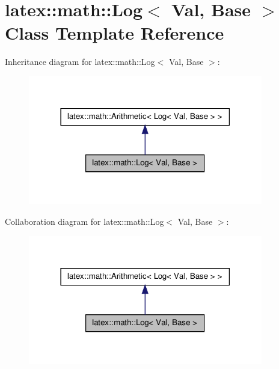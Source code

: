 \hypertarget{classlatex_1_1math_1_1Log}{\section{latex\-:\-:math\-:\-:\-Log$<$ \-Val, \-Base $>$ \-Class \-Template \-Reference}
\label{classlatex_1_1math_1_1Log}
}


\-Inheritance diagram for latex\-:\-:math\-:\-:\-Log$<$ \-Val, \-Base $>$\-:
\nopagebreak
\begin{figure}[H]
\begin{center}
\leavevmode
\includegraphics[width=290pt]{classlatex_1_1math_1_1Log__inherit__graph}
\end{center}
\end{figure}


\-Collaboration diagram for latex\-:\-:math\-:\-:\-Log$<$ \-Val, \-Base $>$\-:
\nopagebreak
\begin{figure}[H]
\begin{center}
\leavevmode
\includegraphics[width=290pt]{classlatex_1_1math_1_1Log__coll__graph}
\end{center}
\end{figure}
